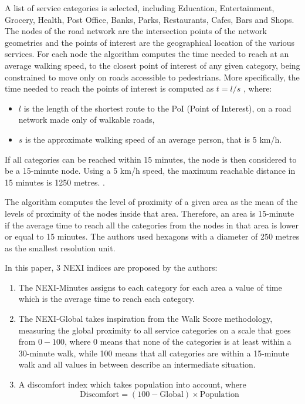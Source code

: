 A list of service categories is selected, including Education, Entertainment, Grocery, Health, Post Office, Banks, Parks, Restaurants, Cafes, Bars and Shops. The nodes of the road network are the intersection points of the network geometries and the points of interest are the geographical location of the various services. For each node the algorithm computes the time needed to reach at an average walking speed, to the closest point of interest of any given category, being constrained to move only on roads accessible to pedestrians. More specifically, the time needed to reach the points of interest is computed as $t = l / s$ , where:

\begin{itemize}
\item $l$ is the length of the shortest route to the PoI (Point of Interest), on a road network made only of walkable roads,
\item $s$ is the approximate walking speed of an average person, that is 5 km/h.
\end{itemize}

If all categories can be reached within 15 minutes, the node is then considered to be a 15-minute node. Using a 5 km/h speed, the maximum reachable distance in 15 minutes is 1250 metres. .

The algorithm computes the level of proximity of a given area as the mean of the levels of proximity of the nodes inside that area. Therefore, an area is 15-minute if the average time to reach all the categories from the nodes in that area is lower or equal to 15 minutes. The authors used hexagons with a diameter of 250 metres as the smallest resolution unit.

In this paper, 3 NEXI indices are proposed by the authors:

\begin{enumerate}
\item The NEXI-Minutes assigns to each category for each area a value of time which is the average time to reach each category.
\item The NEXI-Global takes inspiration from the Walk Score methodology, measuring the global proximity to all service categories on a scale that goes from $0 - 100$, where 0 means that none of the categories is at least within a 30-minute walk, while 100 means that all categories are within a 15-minute walk and all values in between describe an intermediate situation.
\item A discomfort index which takes population into account, where
$$\text{Discomfort} = (100-\text{Global})\times\text{Population}$$
\end{enumerate}

